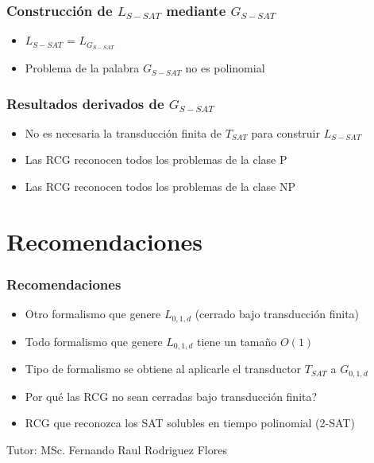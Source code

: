 \documentclass{beamer}
\newcommand{\tutor}{MSc. Fernando Raul Rodriguez Flores} %
\begin{document}
\begin{frame}
    \frametitle{Construcción de $L_{S-SAT}$ mediante $G_{S-SAT}$}
    
    
    \begin{itemize}
        \item $L_{S-SAT}$ = $L_{G_{S-SAT}}$
              \pause
        \item Problema de la palabra $G_{S-SAT}$ no es polinomial
    \end{itemize}
\end{frame}

\begin{frame}
    \frametitle{Resultados derivados de $G_{S-SAT}$}
    
    
    \begin{itemize}
        \item No es necesaria la transducción finita de $T_{SAT}$ para construir $L_{S-SAT}$
              \pause
        \item Las RCG reconocen todos los problemas de la clase P
              \pause
        \item Las RCG reconocen todos los problemas de la clase NP
    \end{itemize}
\end{frame}

\section{Recomendaciones}
\begin{frame}
    \frametitle{Recomendaciones}
    
    \begin{itemize}
        \item Otro formalismo que genere $L_{0,1,d}$ (cerrado bajo transducción finita)
              \pause
        \item Todo formalismo que genere $L_{0,1,d}$ tiene un tamaño $O(1)$
              \pause
        \item Tipo de formalismo se obtiene al aplicarle el transductor $T_{SAT}$ a $G_{0,1,d}$
              \pause
        \item Por qué las RCG no sean cerradas bajo transducción finita?
              \pause
        \item RCG que reconozca los SAT solubles en tiempo polinomial (2-SAT)
    \end{itemize}
    
    
\end{frame}

\begin{frame}
    \titlepage
    \vspace{1cm} %
    \begin{center}
        Tutor: \tutor
    \end{center}
\end{frame}
\end{document}
